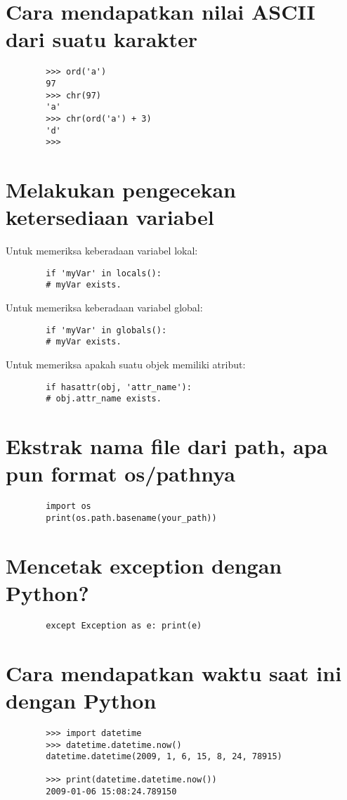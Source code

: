 \documentclass{article}
\begin{document}
	\section {Cara mendapatkan nilai ASCII dari suatu karakter}
	\begin{lstlisting}
		>>> ord('a')
		97
		>>> chr(97)
		'a'
		>>> chr(ord('a') + 3)
		'd'
		>>>
	\end{lstlisting}
	
	\section {Melakukan pengecekan ketersediaan variabel}
	Untuk memeriksa keberadaan variabel lokal:
	\begin{lstlisting}
		if 'myVar' in locals():
		# myVar exists.
	\end{lstlisting}
	Untuk memeriksa keberadaan variabel global:
	\begin{lstlisting}
		if 'myVar' in globals():
		# myVar exists.
	\end{lstlisting}
	Untuk memeriksa apakah suatu objek memiliki atribut:
	\begin{lstlisting}
		if hasattr(obj, 'attr_name'):
		# obj.attr_name exists.
	\end{lstlisting}
	
	\section {Ekstrak nama file dari path, apa pun format os/pathnya}
	\begin{lstlisting}
		import os
		print(os.path.basename(your_path))
	\end{lstlisting}
	
	\section {Mencetak exception dengan Python?}
	\begin{lstlisting}
		except Exception as e: print(e)
	\end{lstlisting}
	
	\section {Cara mendapatkan waktu saat ini dengan Python}
	\begin{lstlisting}
		>>> import datetime
		>>> datetime.datetime.now()
		datetime.datetime(2009, 1, 6, 15, 8, 24, 78915)
		
		>>> print(datetime.datetime.now())
		2009-01-06 15:08:24.789150
	\end{lstlisting}
	
\end{document}
